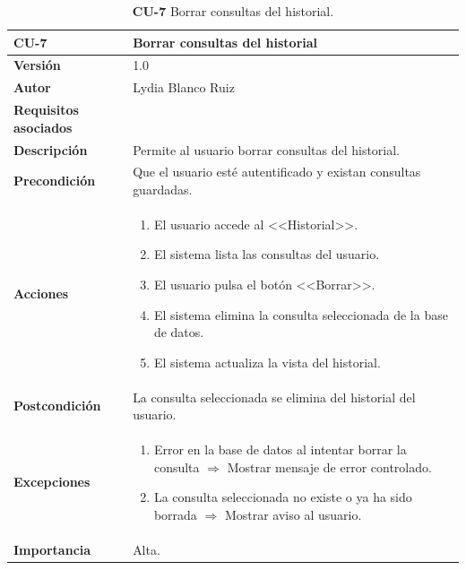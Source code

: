 \begin{table}[p]
	\centering
	\begin{tabularx}{\linewidth}{ p{} p{} }
		\toprule
		\textbf{\textbf{CU-7}}    & \textbf{Borrar consultas del historial}\\
		\toprule
		\textbf{Versión}              & 1.0    \\
		\textbf{Autor}                & Lydia Blanco Ruiz \\
		\textbf{Requisitos asociados} & {RF-11.2} \\
		\textbf{Descripción}          & Permite al usuario borrar consultas del historial. \\
		\textbf{Precondición}         & Que el usuario esté autentificado y existan consultas guardadas. \\
		\textbf{Acciones}             &
		\begin{enumerate}
			\def\labelenumi{\arabic{enumi}.}
			\tightlist
			\item El usuario accede al <<Historial>>.
			\item El sistema lista las consultas del usuario.
			\item El usuario pulsa el botón <<Borrar>>.
			\item El sistema elimina la consulta seleccionada de la base de datos.
			\item El sistema actualiza la vista del historial.
		\end{enumerate}\\
		\textbf{Postcondición}        & La consulta seleccionada se elimina del historial del usuario. \\
		\textbf{Excepciones}          & 
		\begin{enumerate}
			\def\labelenumi{\arabic{enumi}.}
			\tightlist
			\item Error en la base de datos al intentar borrar la consulta $\Rightarrow$ Mostrar mensaje de error controlado.
			\item La consulta seleccionada no existe o ya ha sido borrada $\Rightarrow$ Mostrar aviso al usuario.
		\end{enumerate}\\
		\textbf{Importancia}          & Alta.  \\
		\bottomrule
	\end{tabularx}
	\caption{\textbf{CU-7} Borrar consultas del historial.}
	\label{req-07}
\end{table}

